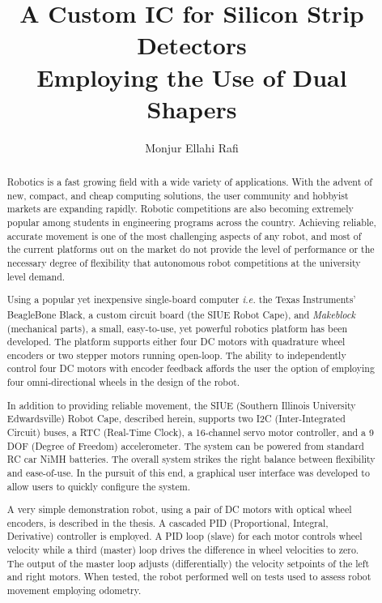 \documentclass[12pt,oneside,final]{siuethesis}
\author{Monjur Ellahi Rafi}
\title{A Custom IC for Silicon Strip Detectors \protect\\
Employing the Use of Dual Shapers}
\theoremstyle{definition}
\begin{document}
\maketitle 

\frontmatter %

\copyrightpage %

\begin{abstract}

Robotics is a fast growing field with a wide variety of applications. With the advent of new, compact, and cheap computing solutions, the user community and hobbyist markets are expanding rapidly. Robotic competitions are also becoming extremely popular among students in engineering programs across the country. Achieving reliable, accurate movement is one of the most challenging aspects of any robot, and most of the current platforms out on the market do not provide the level of performance or the necessary degree of flexibility that autonomous robot competitions at the university level demand. 

Using a popular yet inexpensive single-board computer \emph{i.e.} the Texas Instruments' BeagleBone Black, a custom circuit board (the SIUE Robot Cape), and \emph{Makeblock}\textsuperscript{\textregistered} (mechanical parts), a small, easy-to-use, yet powerful robotics platform has been developed. The platform supports either four DC motors with quadrature wheel encoders or two stepper motors running open-loop. The ability to independently control four DC motors with encoder feedback affords the user the option of employing four omni-directional wheels in the design of the robot.

In addition to providing reliable movement, the SIUE (Southern Illinois University Edwardsville) Robot Cape, described herein, supports two I2C (Inter-Integrated Circuit) buses, a RTC (Real-Time Clock), a 16-channel servo motor controller, and a 9 DOF (Degree of Freedom) accelerometer. The system can be powered from standard RC car NiMH batteries.  The overall system strikes the right balance between flexibility and ease-of-use. In the pursuit of this end, a graphical user interface was developed to allow users to quickly configure the system.

A very simple demonstration robot, using a pair of DC motors with optical wheel encoders, is described in the thesis. A cascaded PID (Proportional, Integral, Derivative) controller is employed.  A PID loop (slave) for each motor controls wheel velocity while a third (master) loop drives the difference in wheel velocities to zero. The output of the master loop adjusts (differentially) the velocity setpoints of the left and right motors. When tested, the robot performed well on tests used to assess robot movement employing odometry.

\end{abstract}
\end{document}
